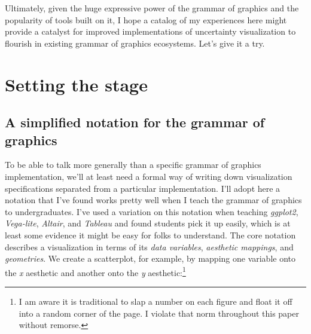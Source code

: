 \documentclass[journal]{vgtc}                     %
\begin{document}
Ultimately, given the huge expressive power of the grammar of graphics and the popularity of tools built on it, I hope a catalog of my experiences here might provide a catalyst for improved implementations of uncertainty visualization to flourish in existing grammar of graphics ecosystems. Let's give it a try.

\section{Setting the stage}

\subsection{A simplified notation for the grammar of graphics}

To be able to talk more generally than a specific grammar of graphics implementation, we'll at least need a formal way of writing down visualization specifications separated from a particular implementation. I'll adopt here a notation that I've found works pretty well when I teach the grammar of graphics to undergraduates. I've used a variation on this notation when teaching \textit{ggplot2}, \textit{Vega-lite}, \textit{Altair}, and \textit{Tableau} and found students pick it up easily, which is at least some evidence it might be easy for folks to understand. The core notation describes a visualization in terms of its \textit{data variables}, \textit{aesthetic mappings}, and \textit{geometries}. We create a scatterplot, for example, by mapping one variable onto the \textit{x} aesthetic and another onto the \textit{y} aesthetic:\footnote{I am aware it is traditional to slap a number on each figure and float it off into a random corner of the page. I violate that norm throughout this paper without remorse.}
\end{document}
